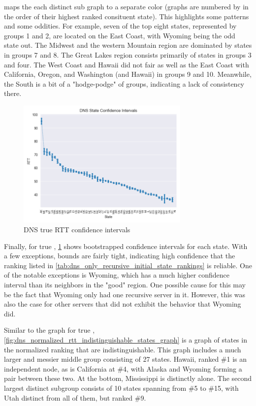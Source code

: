  maps the each distinct sub graph to a separate color (graphs are numbered by in the order of their highest ranked consituent state). This highlights some patterns and some oddities. For example, seven of the top eight states, represented by groups 1 and 2, are located on the East Coast, with Wyoming being the odd state out. The Midwest and the western Mountain region are dominated by states in groups 7 and 8. The Great Lakes region consists primarily of states in groups 3 and four. The West Coast and Hawaii did not fair as well as the East Coast with California, Oregon, and Washington (and Hawaii) in groups 9 and 10. Meanwhile, the South is a bit of a "hodge-podge" of groups, indicating a lack of consistency there.

\begin{figure}[htb]
    \centering
    \includegraphics[width=0.75\textwidth]{images/dns/analysis_no_auth_agg/rtt/no_auth_agg_rtt_confidence.png}
    \caption{DNS true RTT confidence intervals}
    \label{fig:dns_true_rtt_confidence_intervals}
\end{figure}

Finally, for true \rtt, \cref{fig:dns_true_rtt_confidence_intervals} shows bootstrapped confidence intervals for each state. With a few exceptions, bounds are fairly tight, indicating high confidence that the ranking listed in \cref{tab:dns_only_recursive_initial_state_rankings} is reliable. One of the notable exceptions is Wyoming, which has a much higher confidence interval than its neighbors in the "good" \rtt region. One possible cause for this may be the fact that Wyoming only had one recursive server in it. However, this was also the case for other servers that did not exhibit the behavior that Wyoming did.

Similar to the graph for true \rtt, \cref{fig:dns_normalized_rtt_indistinguishable_states_graph} is a graph of states in the normalized \rtt ranking that are indistinguishable. This graph includes a much larger and messier middle group consisting of 27 states. Hawaii, ranked \#1 is an independent node, as is California at \#4, with Alaska and Wyoming forming a pair between these two. At the bottom, Mississippi is distinctly alone. The second largest distinct subgroup consists of 10 states spanning from \#5 to \#15, with Utah distinct from all of them, but ranked \#9.

